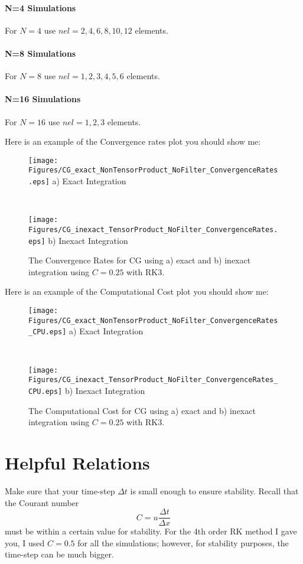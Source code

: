 \documentclass[10pt]{article}
\begin{document}
\paragraph{N=4 Simulations}
For $N=4$ use $nel=2, 4, 6, 8, 10, 12$ elements.

\paragraph{N=8 Simulations}
For $N=8$ use $nel=1, 2, 3, 4, 5, 6$ elements.

\paragraph{N=16 Simulations}
For $N=16$ use $nel=1,2,3$ elements.

Here is an example of the Convergence rates plot you should show me:
\begin{figure}[h]
\begin{center}
\begin{minipage}{2.20in}
\texttt{[image: Figures/CG\_exact\_NonTensorProduct\_NoFilter\_ConvergenceRates.eps]}
a) Exact Integration 
\end{minipage} \ \hspace{0.125in} \
\begin{minipage}{2.20in}
\texttt{[image: Figures/CG\_inexact\_TensorProduct\_NoFilter\_ConvergenceRates.eps]}
b) Inexact Integration
\end{minipage} 
\caption{The Convergence Rates for CG using a) exact and b) inexact integration using $C=0.25$ with RK3.}
\end{center}
\end{figure}

Here is an example of the Computational Cost plot you should show me:
\begin{figure}[h]
\begin{center}
\begin{minipage}{2.20in}
\texttt{[image: Figures/CG\_exact\_NonTensorProduct\_NoFilter\_ConvergenceRates\_CPU.eps]}
a) Exact Integration 
\end{minipage} \ \hspace{0.125in} \
\begin{minipage}{2.20in}
\texttt{[image: Figures/CG\_inexact\_TensorProduct\_NoFilter\_ConvergenceRates\_CPU.eps]}
b) Inexact Integration
\end{minipage} 
\caption{The Computational Cost for CG using a) exact and b) inexact integration using $C=0.25$ with RK3.}
\end{center}
\end{figure}


\section{Helpful Relations}
Make sure that your time-step $\Delta t$ is small enough to ensure stability. Recall that the Courant number
\[
C=u \frac{\Delta t}{\Delta x}
\]
must be within a certain value for stability. 
For the 4th order RK method I gave you, I used $C=0.5$ for all the simulations;
however, for stability purposes, the time-step can be much bigger.
\end{document}
